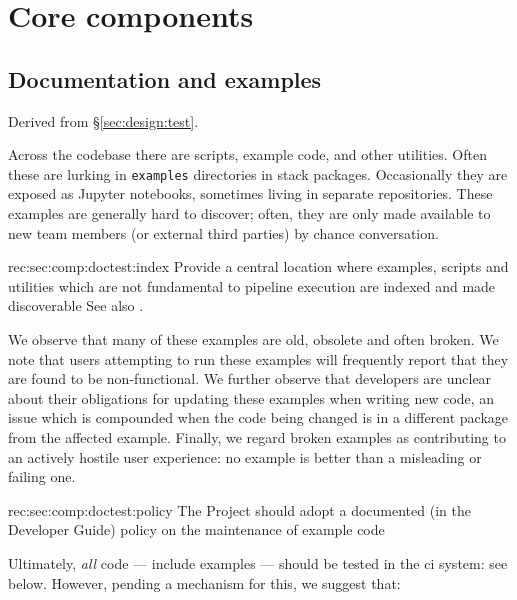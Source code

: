 \section{Core components}
\label{sec:comp}








\subsection{Documentation and examples}
\label{sec:comp:doctest}

Derived from \S\ref{sec:design:test}.

Across the codebase there are scripts, example code, and other utilities.
Often these are lurking in \texttt{examples} directories in stack packages.
Occasionally they are exposed as Jupyter notebooks, sometimes living in separate repositories.
These examples are generally hard to discover; often, they are only made available to new team members (or external third parties) by chance conversation.

\begin{recommendation}
    {rec:sec:comp:doctest:index}
    {Provide a central location where examples, scripts and utilities which are not fundamental to pipeline execution are indexed and made discoverable}
See also .
\end{recommendation}

We observe that many of these examples are old, obsolete and often broken.
We note that users attempting to run these examples will frequently report that they are found to be non-functional.
We further observe that developers are unclear about their obligations for updating these examples when writing new code, an issue which is compounded when the code being changed is in a different package from the affected example.
Finally, we regard broken examples as contributing to an actively hostile user experience: no example is better than a misleading or failing one.

\begin{recommendation}
    {rec:sec:comp:doctest:policy}
    {The Project should adopt a documented (in the Developer Guide) policy on the maintenance of example code}
\end{recommendation}

Ultimately, \emph{all} code --- include examples --- should be tested in the \gls{ci} system: see below.
However, pending a mechanism for this, we suggest that:

